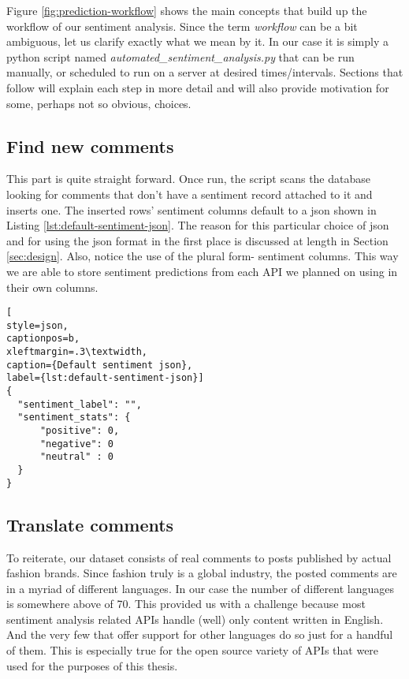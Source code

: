 

Figure \ref{fig:prediction-workflow} shows the main concepts that build up the workflow of our sentiment analysis. 
Since the term \textit{workflow} can be a bit ambiguous, let us clarify exactly what we mean by it. In our case it is simply a python script named \textit{automated\_sentiment\_analysis.py} that can be run manually, or scheduled to run on a server at desired times/intervals. 
Sections that follow will explain each step in more detail and will also provide motivation for some, perhaps not so obvious, choices.


\subsection*{Find new comments\label{sec:find-new-comments}}
This part is quite straight forward.
Once run, the script scans the database looking for comments that don't have a sentiment record attached to it and inserts one.   
The inserted rows' sentiment columns default to a json shown in Listing \ref{lst:default-sentiment-json}. The reason for this particular choice of json and for using the json format in the first place is discussed at length in Section \ref{sec:design}. Also, notice the use of the plural form- sentiment columns. This way we are able to store sentiment predictions from each API we planned on using in their own columns.

\begin{lstlisting}[
style=json,
captionpos=b,
xleftmargin=.3\textwidth,
caption={Default sentiment json},
label={lst:default-sentiment-json}]
{
  "sentiment_label": "",
  "sentiment_stats": {
      "positive": 0,
      "negative": 0
      "neutral" : 0
  }
}
\end{lstlisting}


\subsection*{Translate comments \label{sec:translate-comments}}
To reiterate, our dataset consists of real comments to posts published by actual fashion brands. Since fashion truly is a global industry, the posted comments are in a myriad of different languages. In our case the number of different languages is somewhere above of 70. 
This provided us with a challenge because most sentiment analysis related APIs handle (well) only content written in English. And the very few that offer support for other languages do so just for a handful of them. This is especially true for the open source variety of APIs that were used for the purposes of this thesis. 

